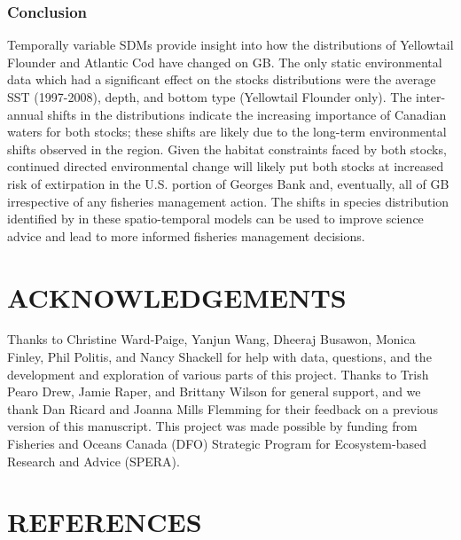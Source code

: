 \documentclass[
]{article}
\begin{document}
\hypertarget{conclusion}{%
\subsubsection{Conclusion}\label{conclusion}}

Temporally variable SDMs provide insight into how the distributions of Yellowtail Flounder and Atlantic Cod have changed on GB. The only static environmental data which had a significant effect on the stocks distributions were the average SST (1997-2008), depth, and bottom type (Yellowtail Flounder only). The inter-annual shifts in the distributions indicate the increasing importance of Canadian waters for both stocks; these shifts are likely due to the long-term environmental shifts observed in the region. Given the habitat constraints faced by both stocks, continued directed environmental change will likely put both stocks at increased risk of extirpation in the U.S. portion of Georges Bank and, eventually, all of GB irrespective of any fisheries management action. The shifts in species distribution identified by in these spatio-temporal models can be used to improve science advice and lead to more informed fisheries management decisions.

\hypertarget{acknowledgements}{%
\section{ACKNOWLEDGEMENTS}\label{acknowledgements}}

Thanks to Christine Ward-Paige, Yanjun Wang, Dheeraj Busawon, Monica Finley, Phil Politis, and Nancy Shackell for help with data, questions, and the development and exploration of various parts of this project. Thanks to Trish Pearo Drew, Jamie Raper, and Brittany Wilson for general support, and we thank Dan Ricard and Joanna Mills Flemming for their feedback on a previous version of this manuscript. This project was made possible by funding from Fisheries and Oceans Canada (DFO) Strategic Program for Ecosystem-based Research and Advice (SPERA).

\clearpage

\newpage

\hypertarget{references}{%
\section*{REFERENCES}\label{references}}
\end{document}
